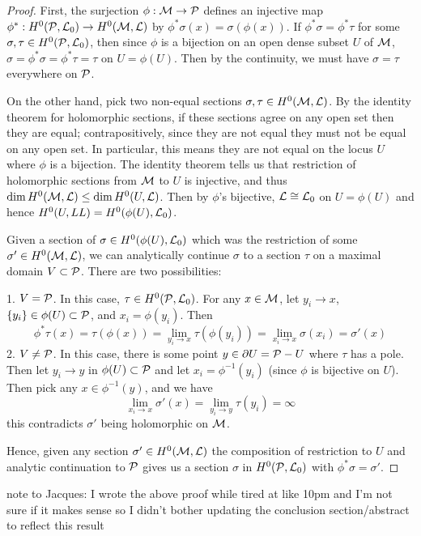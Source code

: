 \begin{proof}
	First, the surjection $\phi:\mathcal{M}\to\mathcal{P}$ defines an injective map $\phi^\ast:H^0(\mathcal{P},\mathcal{L}_0) \to H^0(\mathcal{M},\mathcal{L})$ by
	$\phi^\ast\sigma(x) = \sigma(\phi(x))$. If $\phi^\ast\sigma = \phi^\ast\tau$ for some $\sigma,\tau \in H^0(\mathcal{P},\mathcal{L}_0)$, then since $\phi$ is a bijection on an open dense subset $U$ of $\mathcal{M}$, $\sigma = \phi^\ast \sigma =  \phi^\ast \tau = \tau$ on $U=\phi(U)$. Then by the continuity, we must have $\sigma = \tau$ everywhere on $\mathcal{P}$.
	
	On the other hand, pick two non-equal sections $\sigma, \tau \in H^0(\mathcal{M},\mathcal{L})$. By the identity theorem for holomorphic sections, if these sections agree on any open set then they are equal; contrapositively, since they are not equal they must not be equal on any open set. In particular, this means they are not equal on the locus $U$ where $\phi$ is a bijection. The identity theorem tells us that restriction of holomorphic sections from $\mathcal{M}$ to $U$ is injective, and thus $\dim H^0(\mathcal{M},\mathcal{L}) \leq \dim H^0(U,\mathcal{L})$. Then by $\phi$'s bijective, $\mathcal{L}\cong \mathcal{L}_0$ on $U=\phi(U)$ and hence $H^0(U,LL)=H^0(\phi(U),\mathcal{L}_0)$. 
	
	Given a section of $\sigma \in H^0(\phi(U),\mathcal{L}_0)$ which was the restriction of some $\sigma' \in H^0(\mathcal{M},\mathcal{L})$, we can analytically continue $\sigma$ to a section $\tau $ on a maximal domain $V \subset \mathcal{P}$. There are two possibilities:
	
	1. $V = \mathcal{P}$. In this case, $\tau \in H^0(\mathcal{P},\mathcal{L}_0)$. For any $x\in \mathcal{M}$, let $y_i\to x$, $\{y_i\} \in \phi(U)\subset\mathcal{P}$, and $x_i = \phi(y_i)$. Then
	\begin{equation}
		\phi^\ast \tau(x) = \tau(\phi(x)) = \lim_{y_i \to x}\tau(\phi(y_i)) = \lim_{x_i \to x}\sigma(x_i) = \sigma'(x)
	\end{equation}
	2. $V \neq \mathcal{P}$. In this case, there is some point $y\in \partial U = \mathcal{P} - U$ where $\tau$ has a pole. Then let $y_i\to y$ in $\phi(U) \subset \mathcal{P}$ and let $x_i = \phi^{-1}(y_i)$ (since $\phi$ is bijective on $U$). Then pick any $x \in \phi^{-1}(y)$, and we have
	\begin{equation}
		\lim_{x_i \to x} \sigma'(x) = \lim_{y_i \to y} \tau(y_i) = \infty 
	\end{equation}
	this contradicts $\sigma'$ being holomorphic on $\mathcal{M}$.
	
	Hence, given any section $\sigma'\in H^0(\mathcal{M},\mathcal{L})$ the composition of restriction to $U$ and analytic continuation to $\mathcal{P}$ gives us a section $\sigma$ in $H^0(\mathcal{P},\mathcal{L}_0)$ with $\phi^\ast \sigma = \sigma'$. 
\end{proof}
note to Jacques: I wrote the above proof while tired at like 10pm and I'm not sure if it makes sense so I didn't bother updating the conclusion section/abstract to reflect this result
\iffalse


